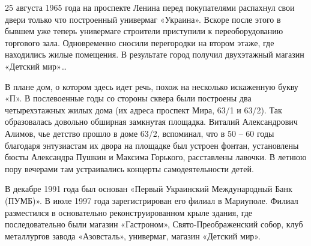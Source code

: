 25 августа 1965 года на проспекте Ленина перед покупателями распахнул свои
двери только что построенный универмаг «Украина». Вскоре после этого в бывшем
уже теперь универмаге строители приступили к переоборудованию торгового зала.
Одновременно сносили перегородки на втором этаже, где находились жилые
помещения. В результате город получил двухэтажный магазин «Детский мир»…

В плане дом, о котором здесь идет речь, похож на несколько искаженную букву
«П». В послевоенные годы со стороны сквера были построены два четырехэтажных
жилых дома (их адреса проспект Мира, 63/1 и 63/2). Так образовалась довольно
обширная замкнутая площадка. Виталий Александрович Алимов, чье детство прошло в
доме 63/2, вспоминал, что в 50 – 60 годы благодаря энтузиастам их двора на
площадке был устроен фонтан, установлены бюсты Александра Пушкин и Максима
Горького, расставлены лавочки. В летнюю пору вечерами там устраивались концерты
самодеятельности детей.

В декабре 1991 года был основан «Первый Украинский Международный Банк (ПУМБ)».
В июле 1997 года зарегистрирован его филиал в Мариуполе. Филиал разместился в
основательно реконструированном крыле здания, где последовательно были магазин
«Гастроном», Свято-Преображенский собор, клуб металлургов завода «Азовсталь»,
универмаг, магазин «Детский мир».
